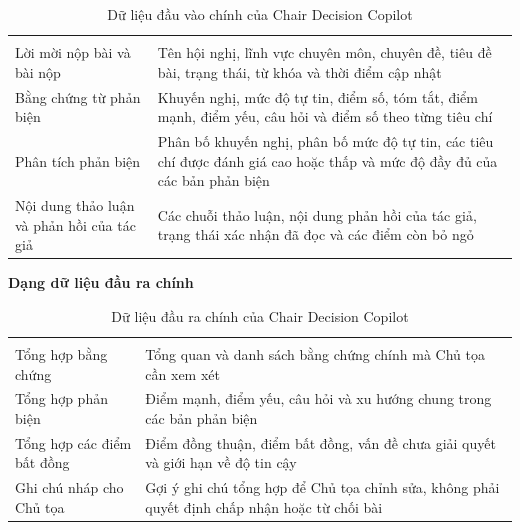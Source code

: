 \begingroup
\setlength{\tabcolsep}{2pt}
\renewcommand{\arraystretch}{1.15}
\begin{longtable}{|C{0.46\textwidth}|P{0.46\textwidth}|}
  \caption{Dữ liệu đầu vào chính của Chair Decision Copilot}\label{tab:ch3-copilot-input}\\
  \hline
       &     \\ \hline
  \endfirsthead
  \hline
       &     \\ \hline
  \endhead
  Lời mời nộp bài và bài nộp   &   Tên hội nghị, lĩnh vực chuyên môn, chuyên đề, tiêu đề bài, trạng thái, từ khóa và thời điểm cập nhật \\ \hline
  Bằng chứng từ phản biện      &      Khuyến nghị, mức độ tự tin, điểm số, tóm tắt, điểm mạnh, điểm yếu, câu hỏi và điểm số theo từng tiêu chí \\ \hline
  Phân tích phản biện     &     Phân bố khuyến nghị, phân bố mức độ tự tin, các tiêu chí được đánh giá cao hoặc thấp và mức độ đầy đủ của các bản phản biện \\ \hline
  Nội dung thảo luận và phản hồi của tác giả      &      Các chuỗi thảo luận, nội dung phản hồi của tác giả, trạng thái xác nhận đã đọc và các điểm còn bỏ ngỏ \\ \hline
\end{longtable}
\endgroup

\textbf{Dạng dữ liệu đầu ra chính}

\begingroup
\setlength{\tabcolsep}{2pt}
\renewcommand{\arraystretch}{1.15}
\begin{longtable}{|C{0.46\textwidth}|P{0.46\textwidth}|}
  \caption{Dữ liệu đầu ra chính của Chair Decision Copilot}\label{tab:ch3-copilot-output}\\
  \hline
       &     \\ \hline
  \endfirsthead
  \hline
       &     \\ \hline
  \endhead
  Tổng hợp bằng chứng   &   Tổng quan và danh sách bằng chứng chính mà Chủ tọa cần xem xét \\ \hline
  Tổng hợp phản biện      &      Điểm mạnh, điểm yếu, câu hỏi và xu hướng chung trong các bản phản biện \\ \hline
  Tổng hợp các điểm bất đồng     &     Điểm đồng thuận, điểm bất đồng, vấn đề chưa giải quyết và giới hạn về độ tin cậy \\ \hline
  Ghi chú nháp cho Chủ tọa      &      Gợi ý ghi chú tổng hợp để Chủ tọa chỉnh sửa, không phải quyết định chấp nhận hoặc từ chối bài \\ \hline
\end{longtable}
\endgroup

